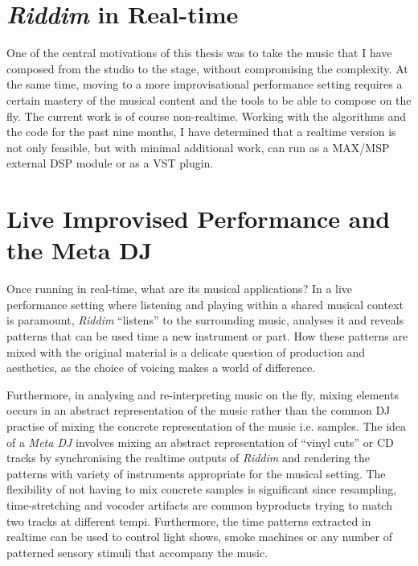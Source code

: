 \vspace{7mm}
\section{{\it Riddim} in Real-time}
\vspace{5mm}

One of the central motivations of this thesis was to take the music
that I have composed from the studio to the stage, without compromising 
the complexity. At the same time, moving to a more improvisational 
performance setting requires a certain mastery of the musical content 
and the tools to be able to compose on the fly. The current work is of
course non-realtime. Working with the algorithms and the code for the
past nine months, I have determined that a realtime version is not
only feasible, but with minimal additional work, can run as a
MAX/MSP{\texttrademark} external DSP module or as a VST{\texttrademark} plugin.

\vspace{7mm}
\section{Live Improvised Performance and the Meta DJ}
\vspace{5mm}

Once running in real-time, what are its musical applications? 
In a live performance setting where listening and playing within 
a shared musical context is paramount, {\it Riddim} ``listens'' to the surrounding
music, analyses it and reveals patterns that can be used time a new
instrument or part. How these patterns are mixed with the original
material is a delicate question of production and aesthetics, as the
choice of voicing makes a world of difference.

Furthermore, in analysing and re-interpreting music on the fly, mixing
elements occurs in an abstract representation of the music rather than the 
common DJ practise of mixing the concrete representation of the music i.e. samples.
The idea of a {\it Meta DJ} involves mixing an abstract representation
of ``vinyl cuts'' or CD tracks by synchronising the realtime outputs of {\it Riddim} and
rendering the patterns with variety of instruments appropriate for the
musical setting. The flexibility of not having to mix concrete samples
is significant since resampling, time-stretching and vocoder artifacts are common
byproducts trying to match two tracks at different tempi. Furthermore, the time patterns
extracted in realtime can be used to control light shows, smoke
machines or any number of patterned sensory stimuli that accompany the
music. 



